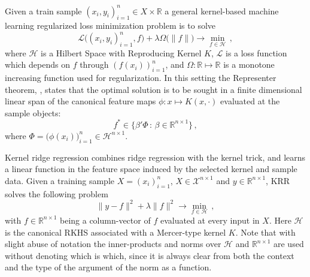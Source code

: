 \documentclass[a4paper,14pt]{extarticle}
\newcommand{\Hcal}{\mathcal{H}}
\newcommand{\Xcal}{\mathcal{X}}
\newcommand{\Real}{\mathbb{R}}
\newcommand{\Lcal}{\mathcal{L}}
\begin{document}
Given a train sample $(x_i, y_i)_{i=1}^n \in X\times \Real$ a general kernel-based
machine learning regularized loss minimization problem is to solve
\begin{equation}
  \Lcal\bigl((x_i, y_i)_{i=1}^n, f\bigr)
    + \lambda \Omega\bigl(\|f\|\bigr)
    \to \min_{f\in \Hcal} \,,
\end{equation}
where $\Hcal$ is a Hilbert Space with Reproducing Kernel $K$, $\Lcal$ is a loss
function which depends on $f$ through $(f(x_i))_{i=1}^n$, and $\Omega:\Real\mapsto\Real$
is a monotone increasing function used for regularization. In this setting the Representer
theorem, \cite{scholkopf2002}, states that the optimal solution is to be sought in a
finite dimensional linear span of the canonical feature maps $\phi: x\mapsto K(x, \cdot)$
evaluated at the sample objects:
\begin{equation*}
  f^* \in \bigl\{ \beta'\Phi\,:\, \beta \in \Real^{n\times 1} \bigr\} \,,
\end{equation*}
where $\Phi = \bigl(\phi(x_i)\bigr)_{i=1}^n \in \Hcal^{n\times 1}$.

Kernel ridge regression combines ridge regression with the kernel trick, and learns
a linear function in the feature space induced by the selected kernel and sample
data. Given a training sample $X = (x_i)_{i=1}^n$, $X\in \Xcal^{n\times 1}$ and
$y \in \Real^{n\times 1}$, KRR solves the following problem
\begin{equation*}
  \|y - f\|^2 + \lambda \|f\|^2 \to \min_{f \in \Hcal} \,,
\end{equation*}
with $f \in \Real^{n\times 1}$ being a column-vector of $f$ evaluated at every input
in $X$. Here $\Hcal$ is the canonical RKHS associated with a Mercer-type kernel $K$.
Note that with slight abuse of notation the inner-products and norms over $\Hcal$
and $\Real^{n\times 1}$ are used without denoting which is which, since it is always
clear from both the context and the type of the argument of the norm as a function.
\end{document}
